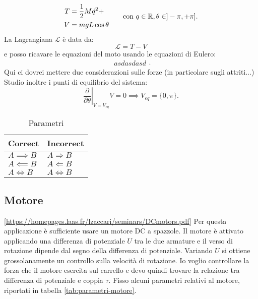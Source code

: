\begin{equation*}
    \begin{aligned}
    T &= \frac 1 2 M  \dot q^2 +  \\ %
    V &= mgL \cos\theta
    \end{aligned}
    \hspace{20pt} \text{con } q \in \R, \theta \in ]-\pi, +\pi].
    \label{eq:energy}
\end{equation*}
La Lagrangiana $\mathcal L$ è data da:
\begin{equation*}
    \mathcal L = T - V
\end{equation*}
e posso ricavare le equazioni del moto usando le equazioni di Eulero:
\begin{equation*}
    \begin{aligned}
    asdasdasd %
    \end{aligned}.
    \label{eq:moto-sistema}
\end{equation*}
Qui ci dovrei mettere due considerazioni sulle forze (in particolare sugli attriti...)
Studio inoltre i punti di equilibrio del sistema:
\begin{equation*}
    \left. \frac \partial {\partial \theta}\right |_{V=V_{eq}} V =  0 \implies V_{eq} = \{0, \pi\}.
\end{equation*}


\begin{table}[htbp]
    \centering
    \begin{tabular}{@{}ll@{}}
        \toprule
        \textbf{Correct}     & \textbf{Incorrect}         \\
        \midrule
        \( A \implies B \)   & \( A \Rightarrow B \)      \\
        \( A \impliedby B \) & \( A \Leftarrow B \)       \\
        \( A \iff B \)       & \( A \Leftrightarrow B \)  \\
        \bottomrule
    \end{tabular}
    \caption[Parametri]{Parametri}
    \label{tab:parametri}
\end{table}

\subsection{Motore}
\ref{https://homepages.laas.fr/lzaccari/seminars/DCmotors.pdf}
Per questa applicazione è sufficiente usare un motore DC a spazzole. Il motore è attivato applicando una differenza di potenziale $U$ tra le due armature e il verso di rotazione dipende dal segno della differenza di potenziale. Variando $U$ si ottiene grossolanamente un controllo sulla velocità di rotazione. Io voglio controllare la forza che il motore esercita sul carrello e devo quindi trovare la relazione tra differenza di potenziale e coppia $\tau$.
Fisso alcuni parametri relativi al motore, riportati in tabella \ref{tab:parametri-motore}.

